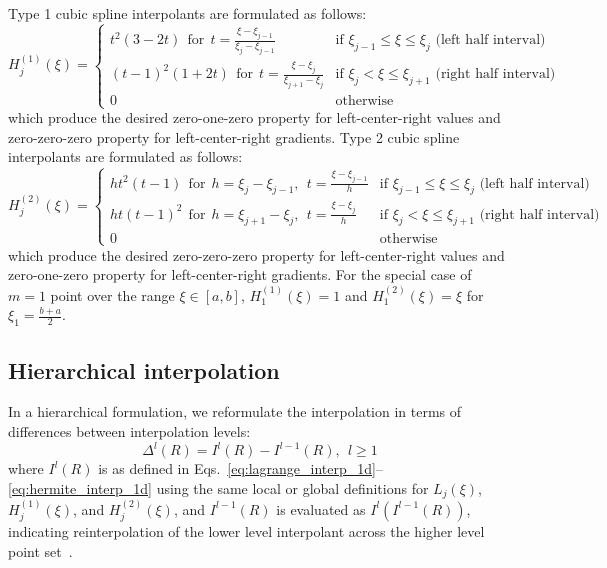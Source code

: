 Type 1 cubic spline interpolants are formulated as follows:
\begin{equation}
H_j^{(1)}(\xi) = 
\begin{cases}
t^2(3-2t) ~~\text{for}~~ t = \frac{\xi-\xi_{j-1}}{\xi_j-\xi_{j-1}} & 
\text{if $\xi_{j-1} \leq \xi \leq \xi_j$ (left half interval)}\\
(t-1)^2(1+2t) ~~\text{for}~~ t = \frac{\xi-\xi_j}{\xi_{j+1}-\xi_j} &
\text{if $\xi_j < \xi \leq \xi_{j+1}$ (right half interval)}\\
0     & \text{otherwise}
\end{cases}
\end{equation}
which produce the desired zero-one-zero property for left-center-right
values and zero-zero-zero property for left-center-right gradients.  
Type 2 cubic spline interpolants are formulated as follows:
\begin{equation}
H_j^{(2)}(\xi) =
\begin{cases}
ht^2(t-1) ~~\text{for}~~ h = \xi_j-\xi_{j-1},~~ t = \frac{\xi-\xi_{j-1}}{h} & 
\text{if $\xi_{j-1} \leq \xi \leq \xi_j$ (left half interval)}\\
ht(t-1)^2 ~~\text{for}~~ h = \xi_{j+1}-\xi_j,~~ t = \frac{\xi-\xi_j}{h} &
\text{if $\xi_j < \xi \leq \xi_{j+1}$ (right half interval)}\\
0     & \text{otherwise}
\end{cases}
\end{equation}
which produce the desired zero-zero-zero property for left-center-right
values and zero-one-zero property for left-center-right gradients.  For 
the special case of $m = 1$ point over the range $\xi \in [a, b]$, 
$H_1^{(1)}(\xi) = 1$ and $H_1^{(2)}(\xi) = \xi$ for $\xi_1 = \frac{b+a}{2}$.


\subsection{Hierarchical interpolation} \label{uq:expansion:interp:hierarch}

In a hierarchical formulation, we reformulate the interpolation in
terms of differences between interpolation levels:
\begin{equation}
\Delta^l(R) = I^l(R) - I^{l-1}(R), ~~l \geq 1 \label{eq:interp_diff}
\end{equation}
where $I^l(R)$ is as defined in
Eqs.~\ref{eq:lagrange_interp_1d}--\ref{eq:hermite_interp_1d} using the 
same local or global definitions for $L_j(\xi)$, $H_j^{(1)}(\xi)$, and 
$H_j^{(2)}(\xi)$, and $I^{l-1}(R)$ is evaluated as $I^l(I^{l-1}(R))$, 
indicating reinterpolation of the lower level interpolant across the 
higher level point set~\cite{spinterp,AgaAlu09}.

